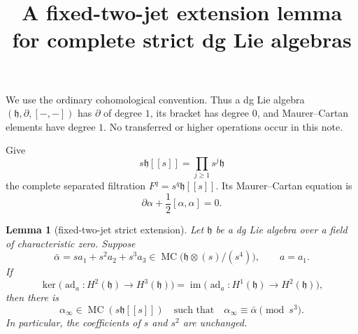 \documentclass[11pt]{article}
\title{A fixed-two-jet extension lemma for complete strict dg Lie algebras}
\author{}
\date{}
\newtheorem{lemma}{Lemma}
\newcommand{\MC}{\operatorname{MC}}
\newcommand{\ad}{\operatorname{ad}}
\newcommand{\im}{\operatorname{im}}
\begin{document}
\maketitle

We use the ordinary cohomological convention.  Thus a dg Lie algebra
$(\mathfrak h,\partial,[-,-])$ has $\partial$ of degree $1$, its bracket has
degree $0$, and Maurer--Cartan elements have degree $1$.  No transferred or
higher operations occur in this note.

Give
\[
 s\mathfrak h[[s]]=\prod_{j\geq 1}s^j\mathfrak h
\]
the complete separated filtration
$F^q=s^q\mathfrak h[[s]]$.  Its Maurer--Cartan equation is
\[
 \partial\alpha+\frac12[\alpha,\alpha]=0.
\]

\begin{lemma}[fixed-two-jet strict extension]\label{lem:strict-extension}
Let $\mathfrak h$ be a dg Lie algebra over a field of characteristic zero.
Suppose
\[
 \bar\alpha=s a_1+s^2a_2+s^3a_3
       \in\MC\bigl(\mathfrak h\otimes (s)/(s^4)\bigr),
 \qquad a=a_1.
\]
If
\[
 \ker\bigl(\ad_a:H^2(\mathfrak h)\longrightarrow H^3(\mathfrak h)\bigr)
 =
 \im\bigl(\ad_a:H^1(\mathfrak h)\longrightarrow H^2(\mathfrak h)\bigr),
 \tag{1}
\]
then there is
\[
 \alpha_\infty\in\MC(s\mathfrak h[[s]])
 \quad\text{such that}\quad
 \alpha_\infty\equiv\bar\alpha\pmod {s^3}.
\]
In particular, the coefficients of $s$ and $s^2$ are unchanged.
\end{lemma}
\end{document}
